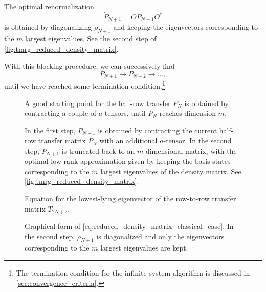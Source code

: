 The optimal renormalization
\begin{equation}
  \widetilde{P}_{N+1} = O P_{N + 1} O^{\dagger}
\end{equation}
is obtained by diagonalizing $\rho_{N + 1}$ and keeping the eigenvectors corresponding
to the $m$ largest eigenvalues. See the second step of \autoref{fig:tmrg_reduced_density_matrix}.

With this blocking procedure, we can successively find
\begin{equation}
    P_{N + 1} \rightarrow P_{N + 2} \rightarrow \dots,
\end{equation}
until we have reached some termination condition.\footnote{The termination condition for the infinite-system algorithm
is discussed in \autoref{sec:convergence_criteria}.}

\begin{figure}
  
  \caption{A good starting point for the half-row transfer $P_N$ is obtained by
  contracting a couple of $a$-tensors, until $P_N$ reaches dimension $m$.}
  \label{fig:tmrg_initial_half_row_transfer_matrix}
\end{figure}

\begin{figure}
  
  \caption{In the first step, $P_{N + 1}$ is obtained by contracting the current half-row
  transfer matrix $P_N$ with an additional $a$-tensor.
  In the second step, $P_{N + 1}$ is truncated back to an $m$-dimensional matrix, with the
  optimal low-rank approximation given by keeping the basis states corresponding to the
  $m$ largest eigenvalues of the density matrix. See
  \autoref{fig:tmrg_reduced_density_matrix}. }
  \label{fig:tmrg_add_site_and_renormalize}
\end{figure}

\begin{figure}
  
  \caption{Equation for the lowest-lying eigenvector of the row-to-row transfer matrix $T_{2N +
  2}$.}
  \label{fig:tmrg_eigenvalue_equation}
\end{figure}

\begin{figure}
  
  \caption{Graphical form of
  \autoref{eq:reduced_density_matrix_classical_case}.
  In the second step, $\rho_{N + 1}$ is diagonalized and only the eigenvectors
  corresponding to the $m$ largest eigenvalues are kept.
  }
  \label{fig:tmrg_reduced_density_matrix}
\end{figure}


